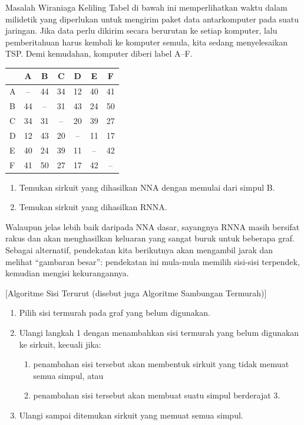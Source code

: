\begin{ex}{Masalah Wiraniaga Keliling}{}
Tabel di bawah ini memperlihatkan waktu dalam milidetik yang diperlukan untuk mengirim paket data antarkomputer pada suatu jaringan.  Jika data perlu dikirim secara berurutan ke setiap komputer, lalu pemberitahuan harus kembali ke komputer semula, kita sedang menyelesaikan TSP. Demi kemudahan, komputer diberi label A--F. 
\begin{center}
\begin{tabular}{|l|c|c|c|c|c|c|}
\hline
&A&B&C&D&E&F\\
\hline
A&--&44&34&12&40&41\\
\hline
B&44&--&31&43&24&50\\
\hline 
C&34&31&--&20&39&27\\
\hline
D&12&43&20&--&11&17\\
\hline
E&40&24&39&11&--&42\\
\hline
F&41&50&27&17&42&--\\
\hline
\end{tabular}
\par{}\label{tab:graphtheory-dor1-tab07}%

\end{center}

\begin{enumerate}[label=\alph*.]
\item	Temukan sirkuit yang dihasilkan NNA dengan memulai dari simpul B.
\item	Temukan sirkuit yang dihasilkan RNNA.
\end{enumerate}
\end{ex}

Walaupun jelas lebih baik daripada NNA dasar, sayangnya RNNA masih bersifat rakus dan akan menghasilkan keluaran yang sangat buruk untuk beberapa graf.  Sebagai alternatif, pendekatan kita berikutnya akan mengambil jarak dan melihat “gambaran besar”: pendekatan ini mula-mula memilih sisi-sisi terpendek, kemudian mengisi kekurangannya.

\begin{algorithm}{}{}[Algoritme Sisi Terurut (disebut juga Algoritme Sambungan Termurah)]
\hspace{3in}
\begin{enumerate}
\item Pilih sisi termurah pada graf yang belum digunakan.
\item Ulangi langkah 1 dengan menambahkan sisi termurah yang belum digunakan ke sirkuit, kecuali jika:
\begin{enumerate}
\item penambahan sisi tersebut akan membentuk sirkuit yang tidak memuat semua simpul, atau
\item penambahan sisi tersebut akan membuat suatu simpul berderajat 3.
\end{enumerate}
\item Ulangi sampai ditemukan sirkuit yang memuat semua simpul.
\end{enumerate}
\end{algorithm}

